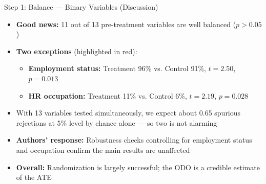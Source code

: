 \documentclass[hyperref={pdfpagelabels=false}]{beamer}
\begin{document}
	\begin{frame}{Step 1: Balance --- Binary Variables (Discussion)}
		\begin{itemize}
			\item \textbf{Good news:} 11 out of 13 pre-treatment variables are well balanced ($p > 0.05$)
			\vspace{0.3cm}
			\item \textbf{Two exceptions} (highlighted in red):
			\vspace{0.2cm}
			\begin{itemize}
				\item \textbf{Employment status:} Treatment 96\% vs. Control 91\%, $t = 2.50$, $p = 0.013$
				\vspace{0.2cm}
				\item \textbf{HR occupation:} Treatment 11\% vs. Control 6\%, $t = 2.19$, $p = 0.028$
			\end{itemize}
			\vspace{0.3cm}
			\item With 13 variables tested simultaneously, we expect about 0.65 spurious rejections at 5\% level by chance alone --- so two is not alarming
			\vspace{0.3cm}
			\item \textbf{Authors' response:} Robustness checks controlling for employment status and occupation confirm the main results are unaffected
			\vspace{0.3cm}
			\item \textbf{Overall:} Randomization is largely successful; the ODO is a credible estimate of the ATE
		\end{itemize}
	\end{frame}
	
\end{document}
